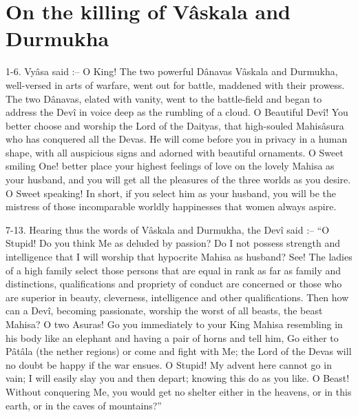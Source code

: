 ﻿\chapter{On the killing of V\^askala and Durmukha}

1-6. Vy\^asa said :-- O King! The two powerful D\^anavas V\^askala and Durmukha, well-versed in arts of warfare, went out for battle, maddened with their prowess. The two D\^anavas, elated with vanity, went to the battle-field and began to address the Dev\^i in voice deep as the rumbling of a cloud. O Beautiful Dev\^i! You better choose and worship the Lord of the Daityas, that high-souled Mahis\^asura who has conquered all the Devas. He will come before you in privacy in a human shape, with all auspicious signs and adorned with beautiful ornaments. O Sweet smiling One! better place your highest feelings of love on the lovely Mahisa as your husband, and you will get all the pleasures of the three worlds as you desire. O Sweet speaking! In short, if you select him as your husband, you will be the mistress of those incomparable worldly happinesses that women always aspire.

7-13. Hearing thus the words of V\^askala and Durmukha, the Dev\^i said :-- ``O Stupid! Do you think Me as deluded by passion? Do I not possess strength and intelligence that I will worship that hypocrite Mahisa as husband? See! The ladies of a high family select those persons that are equal in rank as far as family and distinctions, qualifications and propriety of conduct are concerned or those who are superior in beauty, cleverness, intelligence and other qualifications. Then how can a Dev\^i, becoming passionate, worship the worst of all beasts, the beast Mahisa? O two Asuras! Go you immediately to your King Mahisa resembling in his body like an elephant and having a pair of horns and tell him, Go either to P\^at\^ala (the nether regions) or come and fight with Me; the Lord of the Devas will no doubt be happy if the war ensues. O Stupid! My advent here cannot go in vain; I will easily slay you and then depart; knowing this do as you like. O Beast! Without conquering Me, you would get no shelter either in the heavens, or in this earth, or in the caves of mountains?''

